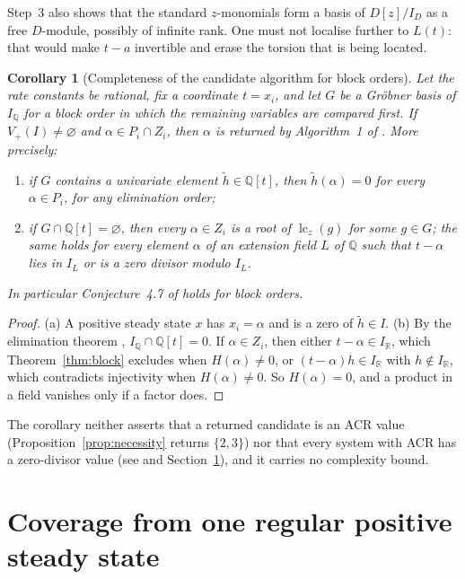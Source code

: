 \documentclass[11pt,a4paper]{article}
\theoremstyle{plain}
\newtheorem{corollary}[theorem]{Corollary}
\theoremstyle{definition}
\theoremstyle{remark}
\newcommand{\R}{\mathbb{R}}
\newcommand{\Q}{\mathbb{Q}}
\newcommand{\lc}{\operatorname{lc}}
\begin{document}
Step~3 also shows that the standard $z$-monomials form a basis of $D[z]/I_D$ as a free $D$-module, possibly of infinite rank. One must not localise further to $L(t)$: that would make $t-a$ invertible and erase the torsion that is being located.

\begin{corollary}[Completeness of the candidate algorithm for block orders]\label{cor:complete}
Let the rate constants be rational, fix a coordinate $t=x_i$, and let $G$ be a Gr\"obner basis of $I_\Q$ for a block order in which the remaining variables are compared first. If $V_+(I)\neq\varnothing$ and $\alpha\in P_i\cap Z_i$, then $\alpha$ is returned by Algorithm~1 of \cite{acr}. More precisely:
\begin{enumerate}[label=(\alph*)]
\item if $G$ contains a univariate element $\tilde h\in\Q[t]$, then $\tilde h(\alpha)=0$ for every $\alpha\in P_i$, for any elimination order;
\item if $G\cap\Q[t]=\varnothing$, then every $\alpha\in Z_i$ is a root of $\lc_z(g)$ for some $g\in G$; the same holds for every element $\alpha$ of an extension field $L$ of $\Q$ such that $t-\alpha$ lies in $I_L$ or is a zero divisor modulo $I_L$.
\end{enumerate}
In particular Conjecture~4.7 of \cite{acr} holds for block orders.
\end{corollary}
\begin{proof}
(a) A positive steady state $x$ has $x_i=\alpha$ and is a zero of $\tilde h\in I$. (b) By the elimination theorem \cite[Chapter~3]{clo}, $I_\Q\cap\Q[t]=0$. If $\alpha\in Z_i$, then either $t-\alpha\in I_\R$, which Theorem~\ref{thm:block} excludes when $H(\alpha)\neq0$, or $(t-\alpha)h\in I_\R$ with $h\notin I_\R$, which contradicts injectivity when $H(\alpha)\neq0$. So $H(\alpha)=0$, and a product in a field vanishes only if a factor does.
\end{proof}

The corollary neither asserts that a returned candidate is an ACR value (Proposition~\ref{prop:necessity} returns $\{2,3\}$) nor that every system with ACR has a zero-divisor value (see \cite[Example 3.11]{acr} and Section~\ref{sec:geometry}), and it carries no complexity bound.

\section{Coverage from one regular positive steady state}\label{sec:geometry}
\end{document}
